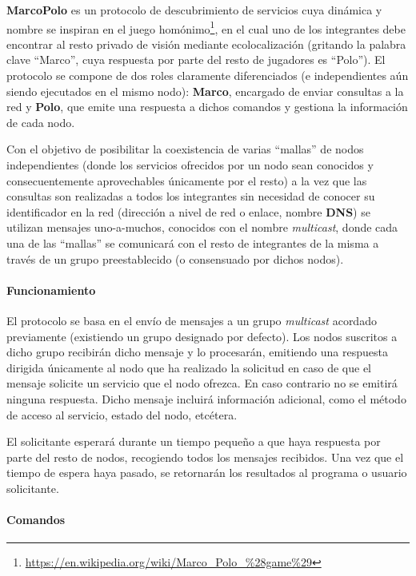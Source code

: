 \textbf{MarcoPolo} es un protocolo de descubrimiento de servicios cuya dinámica y nombre se inspiran en el juego homónimo\footnote{\href{https://en.wikipedia.org/wiki/Marco\_Polo\_\%28game\%29}{https://en.wikipedia.org/wiki/Marco\_Polo\_\%28game\%29}}, en el cual uno de los integrantes debe encontrar al resto privado de visión mediante ecolocalización (gritando la palabra clave ``Marco'', cuya respuesta por parte del resto de jugadores es ``Polo''). El protocolo se compone de dos roles claramente diferenciados (e independientes aún siendo ejecutados en el mismo nodo): \textbf{Marco}, encargado de enviar consultas a la red y \textbf{Polo}, que emite una respuesta a dichos comandos y gestiona la información de cada nodo. %

Con el objetivo de posibilitar la coexistencia de varias ``mallas'' de nodos independientes (donde los servicios ofrecidos por un nodo sean conocidos y consecuentemente aprovechables únicamente por el resto) a la vez que las consultas son realizadas a todos los integrantes sin necesidad de conocer su identificador en la red (dirección a nivel de red o enlace, nombre \textbf{DNS}) se utilizan mensajes uno-a-muchos, conocidos con el nombre \textit{multicast}, donde cada una de las ``mallas'' se comunicará con el resto de integrantes de la misma a través de un grupo preestablecido (o consensuado por dichos nodos).

\paragraph{Funcionamiento\\}

El protocolo se basa en el envío de mensajes a un grupo \textit{multicast} acordado previamente (existiendo un grupo designado por defecto). Los nodos suscritos a dicho grupo recibirán dicho mensaje y lo procesarán, emitiendo una respuesta dirigida únicamente al nodo que ha realizado la solicitud en caso de que el mensaje solicite un servicio que el nodo ofrezca. En caso contrario no se emitirá ninguna respuesta. Dicho mensaje incluirá información adicional, como el método de acceso al servicio, estado del nodo, etcétera.

El solicitante esperará durante un tiempo pequeño a que haya respuesta por parte del resto de nodos, recogiendo todos los mensajes recibidos. Una vez que el tiempo de espera haya pasado, se retornarán los resultados al programa o usuario solicitante.

\paragraph{Comandos\\}

